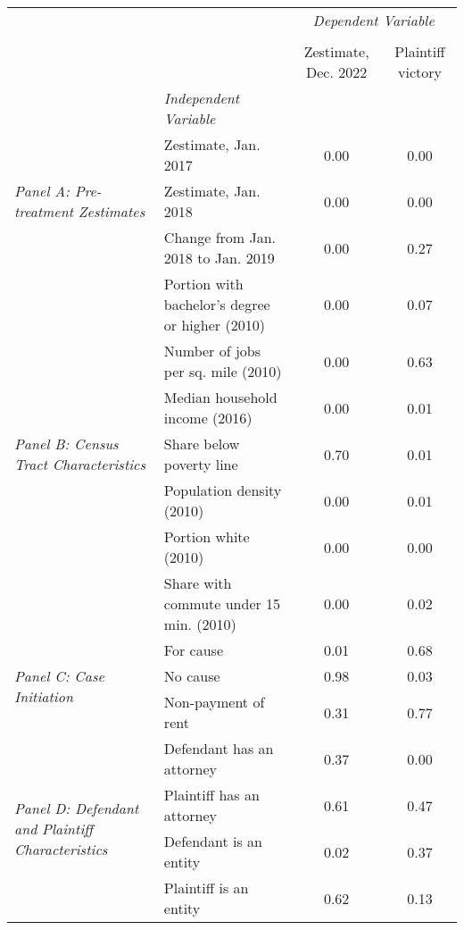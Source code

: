 \begin{tabular}{llcc}
\toprule
 &  & \multicolumn{2}{c}{\textit{Dependent Variable}} \\
\cline{3-4}
\\
 &  & Zestimate, Dec. 2022 & Plaintiff victory \\
 & \emph{Independent Variable} &  &  \\
\midrule
\multirow[c]{3}{3cm}{\textit{Panel A: Pre-treatment Zestimates}} & Zestimate, Jan. 2017 & 0.00 & 0.00 \\
 & Zestimate, Jan. 2018 & 0.00 & 0.00 \\
 & Change from Jan. 2018 to Jan. 2019 & 0.00 & 0.27 \\
\cline{1-4}
\multirow[c]{7}{3cm}{\textit{Panel B: Census Tract Characteristics}} & Portion with bachelor's degree or higher (2010) & 0.00 & 0.07 \\
 & Number of jobs per sq. mile (2010) & 0.00 & 0.63 \\
 & Median household income (2016) & 0.00 & 0.01 \\
 & Share below poverty line & 0.70 & 0.01 \\
 & Population density (2010) & 0.00 & 0.01 \\
 & Portion white (2010) & 0.00 & 0.00 \\
 & Share with commute under 15 min. (2010) & 0.00 & 0.02 \\
\cline{1-4}
\multirow[c]{3}{3cm}{\textit{Panel C: Case Initiation}} & For cause & 0.01 & 0.68 \\
 & No cause & 0.98 & 0.03 \\
 & Non-payment of rent & 0.31 & 0.77 \\
\cline{1-4}
\multirow[c]{4}{3cm}{\textit{Panel D: Defendant and Plaintiff Characteristics}} & Defendant has an attorney & 0.37 & 0.00 \\
 & Plaintiff has an attorney & 0.61 & 0.47 \\
 & Defendant is an entity & 0.02 & 0.37 \\
 & Plaintiff is an entity & 0.62 & 0.13 \\
\cline{1-4}
\bottomrule
\end{tabular}
